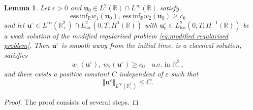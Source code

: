 \documentclass[11pt,a4paper,reqno]{amsart}
\numberwithin{equation}{section}
\newtheorem{lemma}{Lemma}[section]
\theoremstyle{definition}
\theoremstyle{remark}
\newcommand{\bu}{\mathbf{u}}
\newcommand{\essinf}{\mathrm{ess \, inf}}
\newcommand{\loc}{\mathrm{loc}}
\renewcommand{\leq}{\leqslant}
\renewcommand{\geq}{\geqslant}
\begin{document}
{\begin{lemma}\label{lem:to prove the prop}
        Let $\varepsilon>0$ and $\bu_0 \in L^2(\mathbb{R}) \cap L^\infty(\mathbb{R})$ satisfy 
    \begin{equation*}
        \essinf_\mathbb{R} w_1(\bu_0) , ~ \essinf_\mathbb{R} w_2(\bu_0) \geq c_0 
    \end{equation*}
    and let $\bu^\varepsilon \in L^\infty(\mathbb{R}^2_+) \cap L^2_{\loc}(0,T;H^1(\mathbb{R}))$ with $\bu^\varepsilon_t \in L^2_{\loc}(0,T;H^{-1}(\mathbb{R}))$ be a weak solution of the modified regularised problem \eqref{eq:modified regularised problem}. Then $\bu^\varepsilon$ is smooth away from the initial time, is a classical solution, satisfies 
\begin{equation}\label{eq:RI lower bound lem to prove prop}
        w_1(\bu^\varepsilon) , ~ w_2(\bu^\varepsilon) \geq c_0 \quad \text{a.e.~in }\mathbb{R}^2_+, 
    \end{equation}
    and there exists a positive constant $C$ independent of $\varepsilon$ such that 
    \begin{equation*}
        \Vert \bu^\varepsilon \Vert_{L^\infty(\mathbb{R}^2_+)} \leq C. 
    \end{equation*}
\end{lemma}











\begin{proof}

The proof consists of several steps. 


\end{proof}}
\end{document}
